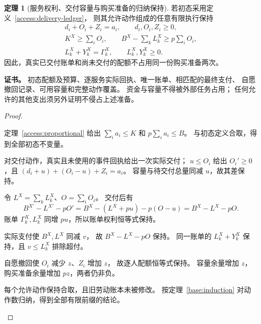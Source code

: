 \documentclass[UTF8,12pt,a4paper,openany,fontset=none,zihao=false]{ctexrep}
\theoremstyle{definition}
\newtheorem{theorem}{定理}[chapter]
\newenvironment{certificate}{\par\noindent\textbf{证书。}\ignorespaces}{\par}
\newcommand{\1}{\mathbf 1}
\begin{document}
\begin{theorem}[服务权利、交付容量与购买准备的归纳保持]
\label{access:delivery-invariant}
若初态采用定义~\ref{access:delivery-ledger}，
则其允许动作组成的任意有限执行保持
\[
\begin{gathered}
d_i+O_i+Z_i=a_i,\qquad d_i,O_i,Z_i\ge0,\\
K^X\ge\sum_iO_i,\qquad
B^X-\sum_kL_k^X\ge p\sum_iO_i,\\
L_k^X+Y_k^X=\Gamma_k^X,\qquad L_k^X,Y_k^X\ge0.
\end{gathered}
\]
因此，真实已交付账单和尚未交付的配额不占用同一份购买准备两次。
\end{theorem}
\begin{certificate}
初态配额及预算、逐服务实际回执、唯一账单、相匹配的最终支付、
自愿撤回记录、可用容量和完整动作覆盖。
资金与容量不得被外部任务占用；
任何允许的其他支出须另外证明不侵占上述准备。
\end{certificate}
\begin{proof}
\begin{semanticsteps}
\item 定理~\ref{access:proportional} 给出
\(\sum_i a_i\le K\) 和 \(p\sum_i a_i\le B\)。
与初态定义合取，得到全部初态不变量。
\item 对交付动作，真实且未使用的事件回执给出一次实际交付；
\(u\le O_i\) 给出 \(O_i'\ge0\)，且
\((d_i+u)+(O_i-u)+Z_i=a_i\)。
容量与待交付总量同减 \(u\)，故其差保持。
\item 令 \(L^X=\sum_kL_k^X\)、\(O=\sum_iO_i\)。
交付后有
\[
B^{X\prime}-L^{X\prime}-pO'
=B^X-(L^X+pu)-p(O-u)=B^X-L^X-pO.
\]
账单 \(\Gamma_k^X,L_k^X\) 同增 \(pu\)，所以账单权利恒等式保持。
\item 实际支付使 \(B^X,L^X\) 同减 \(v\)，
故 \(B^X-L^X-pO\) 保持。
同一账单的 \(L_k^X+Y_k^X\) 保持，且 \(v\le L_k^X\) 排除超付。
\item 自愿撤回使 \(O_i\) 减少 \(z\)、\(Z_i\) 增加 \(z\)，
故逐人配额恒等式保持。
容量余量增加 \(z\)，购买准备余量增加 \(pz\)，两者仍非负。
\item 每个允许动作保持合取，且旧劳动账本未被修改。
按定理~\ref{base:induction} 对动作数归纳，得到全部有限前缀的结论。
\end{semanticsteps}
\end{proof}
\end{document}
